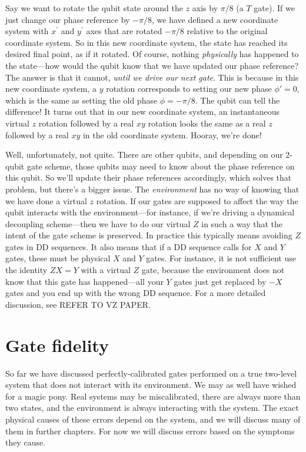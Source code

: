 Say we want to rotate the qubit state around the $z$ axis by $\pi/8$ (a $T$ gate). If we just change our phase reference by $-\pi/8$, we have defined a new coordinate system with $x^\prime$ and $y^\prime$ axes that are rotated $-\pi/8$ relative to the original coordinate system. So in this new coordinate system, the state has reached its desired final point, as if it rotated. Of course, nothing \textit{physically} has happened to the state---how would the qubit know that we have updated our phase reference? The answer is that it cannot, \textit{until we drive our next gate}. This is because in this new coordinate system, a $y$ rotation corresponds to setting our new phase $\phi\prime = 0$, which is the same as setting the old phase $\phi = -\pi/8$. The qubit can tell the difference! It turns out that in our new coordinate system, an instantaneous virtual $z$ rotation followed by a real $xy$ rotation looks the same as a real $z$ followed by a real $xy$ in the old coordinate system. Hooray, we're done!

Well, unfortunately, not quite. There are other qubits, and depending on our 2-qubit gate scheme, those qubits may need to know about the phase reference on this qubit. So we'll update their phase references accordingly, which solves that problem, but there's a bigger issue. The \textit{environment} has no way of knowing that we have done a virtual $z$ rotation. If our gates are supposed to affect the way the qubit interacts with the environment---for instance, if we're driving a dynamical decoupling scheme---then we have to do our virtual $Z$ in such a way that the intent of the gate scheme is preserved. In practice this typically means avoiding $Z$ gates in DD sequences. It also means that if a DD sequence calls for $X$ and $Y$ gates, these must be physical $X$ and $Y$ gates. For instance, it is not sufficient use the identity $ZX = Y$ with a virtual $Z$ gate, because the environment does not know that this gate has happened---all your $Y$ gates just get replaced by $-X$ gates and you end up with the wrong DD sequence.
For a more detailed discussion, see REFER TO VZ PAPER.


\section{Gate fidelity}
So far we have discussed perfectly-calibrated gates performed on a true two-level system that does not interact with its environment. We may as well have wished for a magic pony. Real systems may be miscalibrated, there are always more than two states, and the environment is always interacting with the system. The exact physical causes of these errors depend on the system, and we will discuss many of them in further chapters. For now we will discuss errors based on the symptoms they cause.

